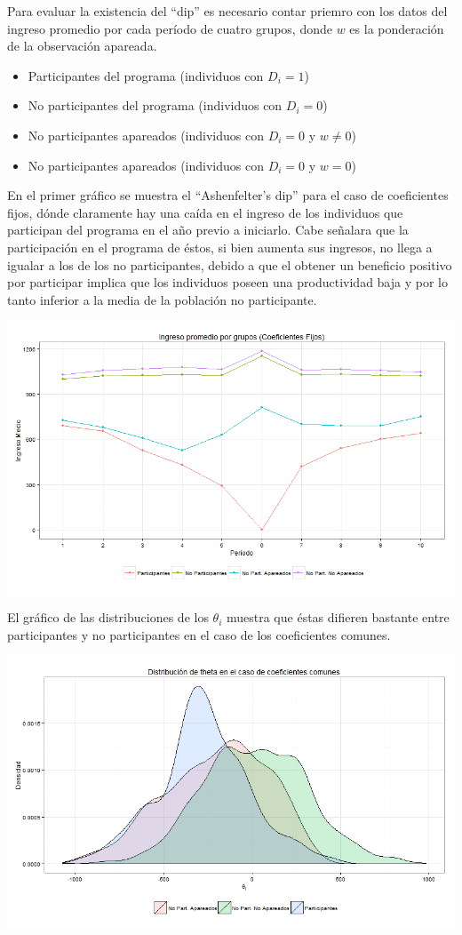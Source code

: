 \documentclass[]{article}
\begin{document}
Para evaluar la existencia del ``dip'' es necesario contar priemro con
los datos del ingreso promedio por cada período de cuatro grupos, donde
$w$ es la ponderación de la observación apareada.

\begin{itemize}
\itemsep1pt\parskip0pt
\item
  Participantes del programa (individuos con $D_{i}=1$)
\item
  No participantes del programa (individuos con $D_{i}=0$)
\item
  No participantes apareados (individuos con $D_{i}=0$ y $w\neq 0$)
\item
  No participantes apareados (individuos con $D_{i}=0$ y $w=0$)
\end{itemize}

En el primer gráfico se muestra el ``Ashenfelter's dip'' para el caso de
coeficientes fijos, dónde claramente hay una caída en el ingreso de los
individuos que participan del programa en el año previo a iniciarlo.
Cabe señalara que la participación en el programa de éstos, si bien
aumenta sus ingresos, no llega a igualar a los de los no participantes,
debido a que el obtener un beneficio positivo por participar implica que
los individuos poseen una productividad baja y por lo tanto inferior a
la media de la población no participante.

\includegraphics{DipConstant.png}

El gráfico de las distribuciones de los $\theta_{i}$ muestra que éstas
difieren bastante entre participantes y no participantes en el caso de
los coeficientes comunes.

\includegraphics{ThetaConst.png}
\end{document}

